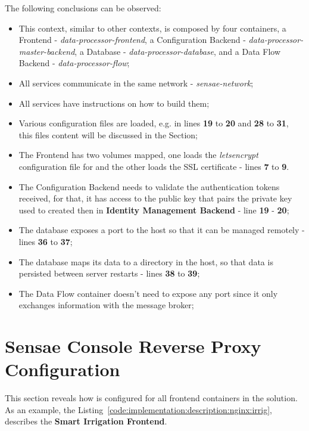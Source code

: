 The following conclusions can be observed:

\begin{itemize}
    \item This context, similar to other contexts, is composed by four containers, a Frontend - \textit{data-processor-frontend}, a Configuration Backend - \textit{data-processor-master-backend}, a Database - \textit{data-processor-database}, and a Data Flow Backend - \textit{data-processor-flow};
    \item All services communicate in the same network - \textit{sensae-network};
    \item All services have instructions on how to build them;
    \item Various configuration files are loaded, e.g. in lines \textbf{19} to \textbf{20} and \textbf{28} to \textbf{31}, this files content will be discussed in the  Section;
    \item The Frontend has two volumes mapped, one loads the \textit{letsencrypt} configuration file for  and the other loads the SSL certificate - lines \textbf{7} to \textbf{9}.
    \item The Configuration Backend needs to validate the authentication tokens received, for that, it has access to the public key that pairs the private key used to created then in \textbf{Identity Management Backend} - line \textbf{19} - \textbf{20};
    \item The database exposes a port to the host so that it can be managed remotely - lines \textbf{36} to \textbf{37};
    \item The database maps its data to a directory in the host, so that data is persisted between server restarts - lines \textbf{38} to \textbf{39};
    \item The Data Flow container doesn't need to expose any port since it only exchanges information with the message broker;
\end{itemize}

\section{Sensae Console Reverse Proxy Configuration}
\label{subsec:implementation:description:nginx}

This section reveals how  is configured for all frontend containers in the solution. As an example, the Listing~\ref{code:implementation:description:nginx:irrig}, describes the \textbf{Smart Irrigation Frontend}.

